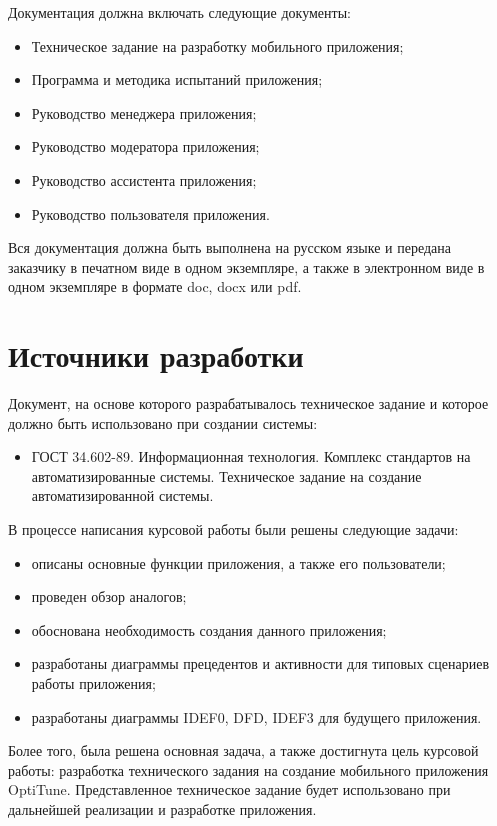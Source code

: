 \documentclass[14pt]{extreport}
\begin{document}
Документация должна включать следующие документы:
\begin{itemize}
	\item Техническое задание на разработку мобильного приложения;
	\item Программа и методика испытаний приложения;
	\item Руководство менеджера приложения;
	\item Руководство модератора приложения;
	\item Руководство ассистента приложения;
	\item Руководство пользователя приложения.
\end{itemize}

Вся документация должна быть выполнена на русском языке и передана заказчику в печатном виде в одном экземпляре, а также в электронном виде в одном экземпляре в формате doc, docx или pdf.

\newpage
\section{Источники разработки}
Документ, на основе которого разрабатывалось техническое задание и которое должно быть использовано при создании системы:
\begin{itemize}
	\item ГОСТ 34.602-89. Информационная технология. Комплекс стандартов на автоматизированные системы. Техническое задание на создание автоматизированной системы.
\end{itemize}


\conclusions

В процессе написания курсовой работы были решены следующие задачи:
\begin{itemize}
	\item описаны основные функции приложения, а также его пользователи;
	\item проведен обзор аналогов;
	\item обоснована необходимость создания данного приложения;
	\item разработаны диаграммы прецедентов и активности для типовых сценариев работы приложения;
	\item разработаны диаграммы IDEF0, DFD, IDEF3 для будущего приложения.
\end{itemize}

Более того, была решена основная задача, а также достигнута цель курсовой работы: разработка технического задания на создание мобильного приложения OptiTune. Представленное техническое задание будет использовано при дальнейшей реализации и разработке приложения. 
\end{document}
